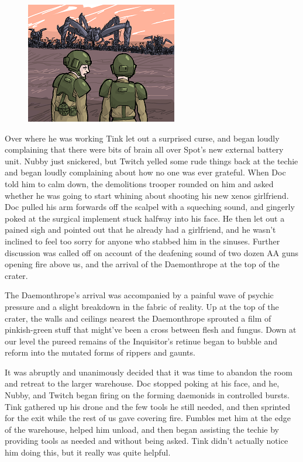 \begin{figure}
	\begin{center}
		\includegraphics[width=\figwidth]{pics/16/40.png}
	\end{center}
\end{figure}
Over where he was working Tink let out a surprised curse, and began loudly complaining that there were bits of brain all over Spot's new external battery unit. 
Nubby just snickered, but Twitch yelled some rude things back at the techie and began loudly complaining about how no one was ever grateful. 
When Doc told him to calm down, the demolitions trooper rounded on him and asked whether he was going to start whining about shooting his new xenos girlfriend. 
Doc pulled his arm forwards off the scalpel with a squeching sound, and gingerly poked at the surgical implement stuck halfway into his face. 
He then let out a pained sigh and pointed out that he already had a girlfriend, and he wasn't inclined to feel too sorry for anyone who stabbed him in the sinuses. 
Further discussion was called off on account of the deafening sound of two dozen AA guns opening fire above us, and the arrival of the Daemonthrope at the top of the crater.

The Daemonthrope's arrival was accompanied by a painful wave of psychic pressure and a slight breakdown in the fabric of reality. 
Up at the top of the crater, the walls and ceilings nearest the Daemonthrope sprouted a film of pinkish-green stuff that might've been a cross between flesh and fungus. 
Down at our level the pureed remains of the Inquisitor's retinue began to bubble and reform into the mutated forms of rippers and gaunts.

It was abruptly and unanimously decided that it was time to abandon the room and retreat to the larger warehouse. 
Doc stopped poking at his face, and he, Nubby, and Twitch began firing on the forming daemonids in controlled bursts. 
Tink gathered up his drone and the few tools he still needed, and then sprinted for the exit while the rest of us gave covering fire. 
Fumbles met him at the edge of the warehouse, helped him unload, and then began assisting the techie by providing tools as needed and without being asked. 
Tink didn't actually notice him doing this, but it really was quite helpful.

